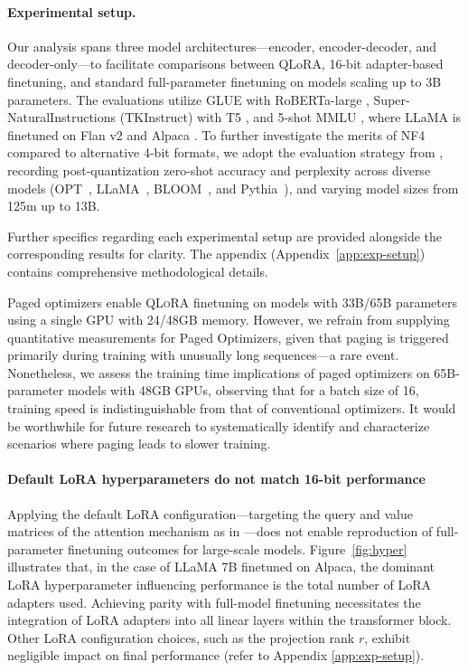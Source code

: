 \paragraph{Experimental setup.} Our analysis spans three model architectures—encoder, encoder-decoder, and decoder-only—to facilitate comparisons between QLoRA, 16-bit adapter-based finetuning, and standard full-parameter finetuning on models scaling up to 3B parameters. The evaluations utilize GLUE \citep{wang2018glue} with RoBERTa-large \citep{liu2019roberta}, Super-NaturalInstructions (TKInstruct) \citep{wang2022super} with T5 \citep{t5}, and 5-shot MMLU \citep{hendrycksmeasuring}, where LLaMA is finetuned on Flan v2 \citep{longpre2023flan} and Alpaca \citep{alpaca}. To further investigate the merits of NF4 compared to alternative 4-bit formats, we adopt the evaluation strategy from \citet{dettmers2022case}, recording post-quantization zero-shot accuracy and perplexity across diverse models (OPT~\citep{zhang2022opt}, LLaMA~\citep{touvron2023llama}, BLOOM~\citep{scao2022bloom}, and Pythia~\citep{biderman2023pythia}), and varying model sizes from 125m up to 13B.

Further specifics regarding each experimental setup are provided alongside the corresponding results for clarity. The appendix (Appendix~\ref{app:exp-setup}) contains comprehensive methodological details.

Paged optimizers enable \textsc{QLoRA} finetuning on models with 33B/65B parameters using a single GPU with 24/48GB memory. However, we refrain from supplying quantitative measurements for Paged Optimizers, given that paging is triggered primarily during training with unusually long sequences—a rare event. Nonetheless, we assess the training time implications of paged optimizers on 65B-parameter models with 48GB GPUs, observing that for a batch size of 16, training speed is indistinguishable from that of conventional optimizers. It would be worthwhile for future research to systematically identify and characterize scenarios where paging leads to slower training.

\paragraph{Default LoRA hyperparameters do not match 16-bit performance}

Applying the default LoRA configuration—targeting the query and value matrices of the attention mechanism as in \citep{hu2021lora}—does not enable reproduction of full-parameter finetuning outcomes for large-scale models. Figure~\ref{fig:hyper} illustrates that, in the case of LLaMA 7B finetuned on Alpaca, the dominant LoRA hyperparameter influencing performance is the total number of LoRA adapters used. Achieving parity with full-model finetuning necessitates the integration of LoRA adapters into all linear layers within the transformer block. Other LoRA configuration choices, such as the projection rank $r$, exhibit negligible impact on final performance (refer to Appendix \ref{app:exp-setup}).

